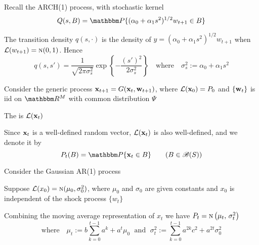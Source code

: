 \begin{frame}

    \vspace{2em}
    \Eg
        Recall the ARCH(1) process, with stochastic kernel 
         \begin{equation*}
            Q(s, B) = \PP\{ (\alpha_0 + \alpha_1 s^2)^{1/2} w_{t+1} \in B \}
        \end{equation*}
        
        The transition density $q(s, \cdot)$ is the density
        of $y = (\alpha_0 + \alpha_1 s^2)^{1/2} w_{t+1}$ when
        $\mathcal L(w_{t+1}) = \textrm{\sc n}(0, 1)$.  Hence
        \begin{equation*}
            \label{eq:arch_td}
            q(s, s') 
            = 
            \frac{1}{\sqrt{2 \pi \sigma_s^2}}
               \exp \left\{ - 
               \frac{(s')^2}{2\sigma^2_s} \right\} 
            \quad \text{where} \quad
            \sigma^2_s := \alpha_0 + \alpha_1 s^2
        \end{equation*}
\end{frame}

\begin{frame}

    \vspace{2em}
    Consider the generic process 
    ${\mathbf x}_{t+1} = G({\mathbf x}_t, {\mathbf w}_{t+1})$, where 
    $\mathcal L({\mathbf x}_0) = P_0$ and $\{{\mathbf w}_t\}$ is {\sc iid} on $\RR^M$ with common
    distribution $\Psi$
    
    The  is
    $\mathcal L({\mathbf x}_t)$ 
    
    \vspace{1em}
    Since ${\mathbf x}_t$ is a well-defined random vector, $\mathcal L({\mathbf x}_t)$ is also well-defined, and we denote it by
    \begin{equation*}
        P_t(B) = \PP\{\boldx_t \in B\}
        \qquad (B \in \bB(S))
    \end{equation*}
    \end{frame}

\begin{frame}

    \vspace{2em}
    \Eg Consider the Gaussian AR(1) process
        
        Suppose $\mathcal L(x_0)= \textrm{\sc n}(\mu_0,
        \sigma_0^2)$, where $\mu_0$ and $\sigma_0$ are given constants and $x_0$
        is independent of the shock process $\{w_t\}$
    
        Combining the moving average representation of $x_t$ we have $P_t = \textrm{\sc n} \left(
                    \mu_t, \, \sigma_t^2
                \right)$ 
        \begin{equation*}
            \text{where} \quad
            \mu_t := b \sum_{k=0}^{t-1} a^k + a^t \mu_0
            \; \text{ and } \;
            \sigma^2_t := \sum_{k=0}^{t-1} a^{2k} c^2  + a^{2t} \sigma_0^2
        \end{equation*}
\end{frame}

